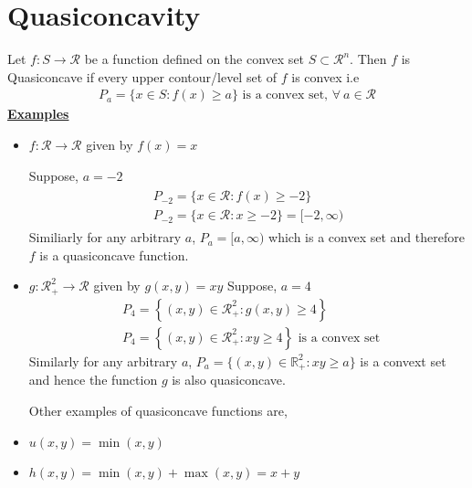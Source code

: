 \documentclass[12pt,a4paper]{article}
\begin{document}
\section{Quasiconcavity}
Let \(f: S \rightarrow \mathcal{R}\) be a function defined on the convex set \(S \subset \mathcal{R}^n\). Then \(f\) is Quasiconcave if every upper contour/level set of \(f\) is convex i.e
\begin{align*}
P_a=\{x \in S: f(x) \geq a\} \text { is a convex set, } \forall  \ a \in \mathcal{R}
\end{align*}
\textbf{\underline{Examples}}
\begin{itemize}
    \item \(f: \mathcal{R} \rightarrow \mathcal{R}\) given by \(f(x)=x\)

Suppose, \(a=-2\)
\begin{align*}
\begin{gathered}
P_{-2}=\{x \in \mathcal{R}: f(x) \geq-2\} \\
P_{-2}=\{x \in \mathcal{R}: x \geq-2\} = [-2,\infty)
\end{gathered}
\end{align*}
Similiarly for any arbitrary \(a\), \(P_{a}=[a,\infty)\) which is a convex set and therefore \(f\) is a quasiconcave function.  

\item \(g: \mathcal{R}_{+}^2 \rightarrow \mathcal{R}\) given by \(g(x, y)=x y\) Suppose, \(a=4\)
\begin{align*}
&P_4=\left\{(x, y) \in \mathcal{R}_{+}^2: g(x, y) \geq 4\right\} \\
&P_4=\left\{(x, y) \in \mathcal{R}_{+}^2: x y \geq 4\right\} \text{ is a convex set }
\end{align*}
Similarly for any arbitrary \(a\), \(P_{a} = \{(x,y) \in \mathbb{R}^2_{+} : xy \geq a\}\) is a convext set and hence the function \(g\) is also quasiconcave.  

Other examples of quasiconcave functions are,
\item \(u(x,y)=\min(x,y)\) 
\item \(h(x,y)=\min(x,y) + \max(x,y) = x + y\)   
\end{itemize} 
\end{document}

